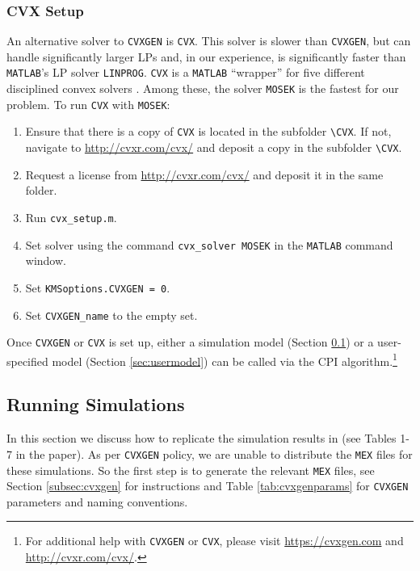 \documentclass[12pt]{article}
\def\code#1{\texttt{#1}}
\begin{document}
\subsubsection{CVX Setup}
An alternative solver to \code{CVXGEN} is \code{CVX}.  This solver is slower than \code{CVXGEN}, but can handle significantly larger LPs and, in our experience, is significantly faster than \code{MATLAB}'s LP solver \code{LINPROG}.  \code{CVX} is a \code{MATLAB} ``wrapper'' for five different disciplined convex solvers \cite{cvx,gb08}.  Among these, the solver \code{MOSEK} is the fastest for our problem.  To run \code{CVX} with \code{MOSEK}:
\begin{enumerate}
\item Ensure that there is a copy of \code{CVX} is located in the subfolder \code{\textbackslash CVX}.  If not, navigate to \url{http://cvxr.com/cvx/} and deposit a copy in the subfolder \code{\textbackslash CVX}.
\item Request a license from  \url{http://cvxr.com/cvx/} and deposit it in the same folder.
\item Run \code{cvx\_setup.m}.
\item Set solver using the command \code{cvx\_solver MOSEK} in the \code{MATLAB} command window.
\item Set \code{KMSoptions.CVXGEN = 0}.
\item Set  \code{CVXGEN\_name} to the empty set.
\end{enumerate}
Once \code{CVXGEN} or \code{CVX} is set up, either a simulation model (Section \ref{sec:simulations}) or a user-specified model (Section \ref{sec:usermodel}) can be called via the CPI algorithm.\footnote{For additional help with \code{CVXGEN} or \code{CVX}, please visit   \url{https://cvxgen.com} and \url{http://cvxr.com/cvx/}.}

\subsection{Running Simulations}\label{sec:simulations}
In this section we discuss how to replicate the simulation results in  (see Tables 1-7 in the paper).  As per \code{CVXGEN} policy, we are unable to distribute the \code{MEX} files for these simulations.  So the first step is to generate the relevant \code{MEX} files, see Section \ref{subsec:cvxgen} for instructions and Table \ref{tab:cvxgenparams} for \code{CVXGEN} parameters and naming conventions.
\end{document}
